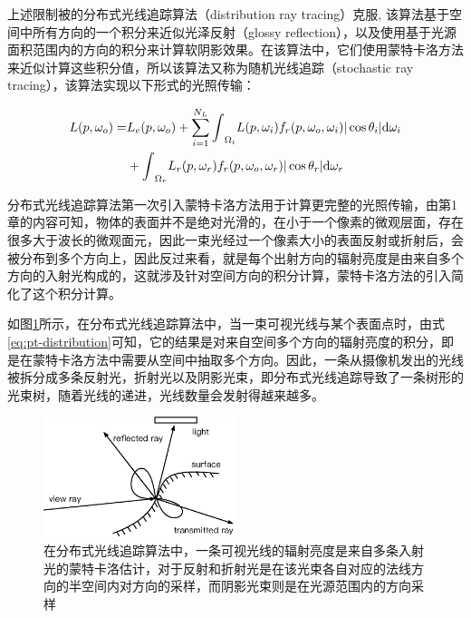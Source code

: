 上述限制被\cite{a:DistributedRayTracing}的分布式光线追踪算法（distribution ray tracing）克服, 该算法基于空间中所有方向的一个积分来近似光泽反射（glossy reflection），以及使用基于光源面积范围内的方向的积分来计算软阴影效果。在该算法中，它们使用蒙特卡洛方法来近似计算这些积分值，所以该算法又称为随机光线追踪（stochastic ray tracing），该算法实现以下形式的光照传输：

\begin{equation}
\begin{aligned}
	L(p,\omega_o)=&L_e(p, \omega_o)+\sum_{i=1}^{N_L}{\rm \int}_{\Omega_i}L(p,\omega_i) f_r(p,\omega_o,\omega_i)|\cos\theta_i|{\rm d}\omega_i\\
	&+{\rm \int}_{\Omega_r}L_r(p,\omega_r)f_r(p,\omega_o,\omega_r)|\cos\theta_r|{\rm d}\omega_r
\end{aligned}
\label{eq:pt-distribution}
\end{equation}

分布式光线追踪算法第一次引入蒙特卡洛方法用于计算更完整的光照传输，由第1章的内容可知，物体的表面并不是绝对光滑的，在小于一个像素的微观层面，存在很多大于波长的微观面元，因此一束光经过一个像素大小的表面反射或折射后，会被分布到多个方向上，因此反过来看，就是每个出射方向的辐射亮度是由来自多个方向的入射光构成的，这就涉及针对空间方向的积分计算，蒙特卡洛方法的引入简化了这个积分计算。

如图\ref{f:pt-distribution-ray-tracing}所示，在分布式光线追踪算法中，当一束可视光线与某个表面点时，由式\ref{eq:pt-distribution}可知，它的结果是对来自空间多个方向的辐射亮度的积分，即是在蒙特卡洛方法中需要从空间中抽取多个方向。因此，一条从摄像机发出的光线被拆分成多条反射光，折射光以及阴影光束，即分布式光线追踪导致了一条树形的光束树，随着光线的递进，光线数量会发射得越来越多。

\begin{figure}
\sidecaption
	\includegraphics[width=0.5\textwidth]{figures/pt/distribution}
	\caption{在分布式光线追踪算法中，一条可视光线的辐射亮度是来自多条入射光的蒙特卡洛估计，对于反射和折射光是在该光束各自对应的法线方向的半空间内对方向的采样，而阴影光束则是在光源范围内的方向采样}
	\label{f:pt-distribution-ray-tracing}
\end{figure}

